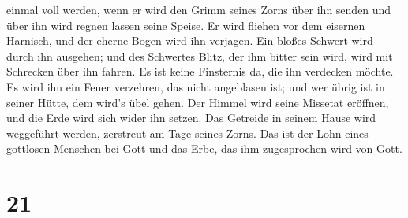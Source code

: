 einmal voll werden, wenn er wird den Grimm seines Zorns über ihn senden
und über ihn wird regnen lassen seine Speise.  Er wird
fliehen vor dem eisernen Harnisch, und der eherne Bogen wird ihn
verjagen.  Ein bloßes Schwert wird durch ihn ausgehen;
und des Schwertes Blitz, der ihm bitter sein wird, wird mit Schrecken
über ihn fahren.  Es ist keine Finsternis da, die ihn
verdecken möchte. Es wird ihn ein Feuer verzehren, das nicht angeblasen
ist; und wer übrig ist in seiner Hütte, dem wird's übel gehen.
 Der Himmel wird seine Missetat eröffnen, und die Erde
wird sich wider ihn setzen.  Das Getreide in seinem Hause
wird weggeführt werden, zerstreut am Tage seines Zorns. 
Das ist der Lohn eines gottlosen Menschen bei Gott und das Erbe, das ihm
zugesprochen wird von Gott.

\hypertarget{section-20}{%
\section{21}\label{section-20}}

